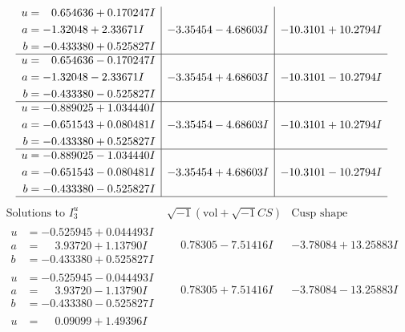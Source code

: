 \documentclass[1p]{elsarticle_modified}
\theoremstyle{definition}
\newcommand{\I}{\sqrt{-1}}
\begin{document}
$$\begin{array}{c|c|c}
\begin{aligned}
u &= \phantom{-}0.654636 + 0.170247 I \\
a &= -1.32048 + 2.33671 I \\
b &= -0.433380 + 0.525827 I\end{aligned}
 & -3.35454 - 4.68603 I & -10.3101 + 10.2794 I \\ \hline\begin{aligned}
u &= \phantom{-}0.654636 - 0.170247 I \\
a &= -1.32048 - 2.33671 I \\
b &= -0.433380 - 0.525827 I\end{aligned}
 & -3.35454 + 4.68603 I & -10.3101 - 10.2794 I \\ \hline\begin{aligned}
u &= -0.889025 + 1.034440 I \\
a &= -0.651543 + 0.080481 I \\
b &= -0.433380 + 0.525827 I\end{aligned}
 & -3.35454 - 4.68603 I & -10.3101 + 10.2794 I \\ \hline\begin{aligned}
u &= -0.889025 - 1.034440 I \\
a &= -0.651543 - 0.080481 I \\
b &= -0.433380 - 0.525827 I\end{aligned}
 & -3.35454 + 4.68603 I & -10.3101 - 10.2794 I\\
 \hline 
 \end{array}$$\newpage$$\begin{array}{c|c|c}  
\text{Solutions to }I^u_{3}& \I (\text{vol} + \sqrt{-1}CS) & \text{Cusp shape}\\
 \hline 
\begin{aligned}
u &= -0.525945 + 0.044493 I \\
a &= \phantom{-}3.93720 + 1.13790 I \\
b &= -0.433380 + 0.525827 I\end{aligned}
 & \phantom{-}0.78305 - 7.51416 I & -3.78084 + 13.25883 I \\ \hline\begin{aligned}
u &= -0.525945 - 0.044493 I \\
a &= \phantom{-}3.93720 - 1.13790 I \\
b &= -0.433380 - 0.525827 I\end{aligned}
 & \phantom{-}0.78305 + 7.51416 I & -3.78084 - 13.25883 I \\ \hline\begin{aligned}
u &= \phantom{-}0.09099 + 1.49396 I \\

\end{aligned}
\end{array}$$
\end{document}
